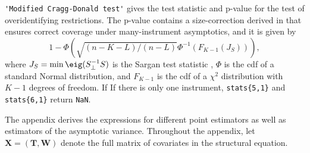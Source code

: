 \documentclass{mynotes}
\newcommand{\bx}{\mathbf{X}} %
\newcommand{\bt}{\mathbf{T}} %
\newcommand{\bw}{\mathbf{W}} %
\begin{document}
\lstinline!'Modified Cragg-Donald test'! gives the test statistic and p-value
for the \citet{cd93} test of overidentifying restrictions. The p-value contains
a size-correction derived in \citet{kolesar12re} that ensures correct coverage
under many-instrument asymptotics, and it is given by
\begin{equation*}
  1-\Phi(\sqrt{(n-K-L)/(n-L)}\Phi^{-1}(F_{K-1}(J_{S}))),
\end{equation*}
where $J_{S}=\min\eig(S_{\perp}^{-1}S)$ is the Sargan test statistic , $\Phi$ is
the cdf of a standard Normal distribution, and $F_{K-1}$ is the cdf of a
$\chi^{2}$ distribution with $K-1$ degrees of freedom. If If there is only one
instrument, \lstinline!stats{5,1}! and \lstinline!stats{6,1}! return
\lstinline!NaN!.


\begin{appendices}
  The appendix derives the expressions for different point estimators as well as
  estimators of the asymptotic variance. Throughout the appendix, let
  $\bx=(\bt,\bw)$ denote the full matrix of covariates in the structural
  equation.


\end{appendices}
\end{document}
